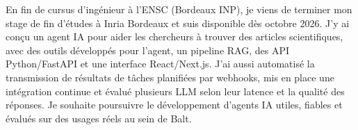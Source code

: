 
\begin{cvparagraph}
En fin de cursus d’ingénieur à l’ENSC (Bordeaux INP), je viens de terminer mon stage de fin d’études à Inria Bordeaux et suis disponible dès octobre 2026. J’y ai conçu un agent IA pour aider les chercheurs à trouver des articles scientifiques, avec des outils développés pour l’agent, un pipeline RAG, des API Python/FastAPI et une interface React/Next.js. J’ai aussi automatisé la transmission de résultats de tâches planifiées par webhooks, mis en place une intégration continue et évalué plusieurs LLM selon leur latence et la qualité des réponses. Je souhaite poursuivre le développement d’agents IA utiles, fiables et évalués sur des usages réels au sein de Balt.
\end{cvparagraph}
